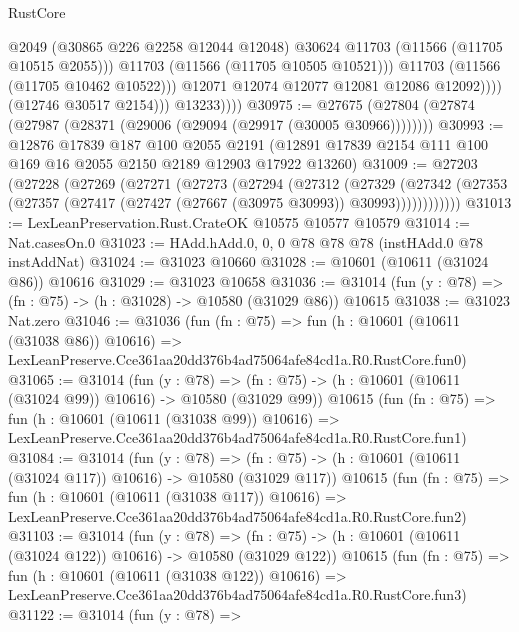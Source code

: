 \begin{lexlean}{RustCore}
\begin{coremodule}
                              @2049
                              (@30865 @226 @2258 @12044 @12048)
                              @30624
                              @11703
                              (@11566 (@11705 @10515 @2055)))
                            @11703
                            (@11566 (@11705 @10505 @10521)))
                          @11703
                          (@11566 (@11705 @10462 @10522)))
                        @12071
                        @12074
                        @12077
                        @12081
                        @12086
                        @12092))))
                (@12746 @30517 @2154)))
            @13233))))
@30975 := @27675 (@27804 (@27874 (@27987 (@28371 (@29006 (@29094 (@29917 (@30005 @30966))))))))
@30993 := @12876
    @17839
    @187
    @100
    @2055
    @2191
    (@12891 @17839 @2154 @111 @100 @169 @16 @2055 @2150 @2189 @12903 @17922 @13260)
@31009 := @27203
    (@27228
      (@27269
        (@27271
          (@27273
            (@27294
              (@27312
                (@27329
                  (@27342
                    (@27353 (@27357 (@27417 (@27427 (@27667 (@30975 @30993)) @30993))))))))))))
@31013 := LexLeanPreservation.Rust.CrateOK @10575 @10577 @10579
@31014 := Nat.casesOn.{0}
@31023 := HAdd.hAdd.{0, 0, 0} @78 @78 @78 (instHAdd.{0} @78 instAddNat)
@31024 := @31023 @10660
@31028 := @10601 (@10611 (@31024 @86)) @10616
@31029 := @31023 @10658
@31036 := @31014 (fun (y : @78) => (fn : @75) -> (h : @31028) -> @10580 (@31029 @86)) @10615
@31038 := @31023 Nat.zero
@31046 := @31036
    (fun (fn : @75) =>
    fun (h : @10601 (@10611 (@31038 @86)) @10616) =>
    LexLeanPreserve.Cce361aa20dd376b4ad75064afe84cd1a.R0.RustCore.fun0)
@31065 := @31014
    (fun (y : @78) =>
    (fn : @75) -> (h : @10601 (@10611 (@31024 @99)) @10616) -> @10580 (@31029 @99))
    @10615
    (fun (fn : @75) =>
    fun (h : @10601 (@10611 (@31038 @99)) @10616) =>
    LexLeanPreserve.Cce361aa20dd376b4ad75064afe84cd1a.R0.RustCore.fun1)
@31084 := @31014
    (fun (y : @78) =>
    (fn : @75) -> (h : @10601 (@10611 (@31024 @117)) @10616) -> @10580 (@31029 @117))
    @10615
    (fun (fn : @75) =>
    fun (h : @10601 (@10611 (@31038 @117)) @10616) =>
    LexLeanPreserve.Cce361aa20dd376b4ad75064afe84cd1a.R0.RustCore.fun2)
@31103 := @31014
    (fun (y : @78) =>
    (fn : @75) -> (h : @10601 (@10611 (@31024 @122)) @10616) -> @10580 (@31029 @122))
    @10615
    (fun (fn : @75) =>
    fun (h : @10601 (@10611 (@31038 @122)) @10616) =>
    LexLeanPreserve.Cce361aa20dd376b4ad75064afe84cd1a.R0.RustCore.fun3)
@31122 := @31014
    (fun (y : @78) =>

\end{coremodule}
\end{lexlean}
